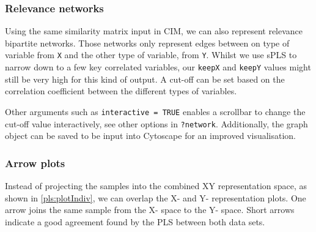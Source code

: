 \documentclass[]{book}
\newenvironment{Shaded}{\begin{snugshade}}{\end{snugshade}}
\newcommand{\KeywordTok}[1]{\textcolor[rgb]{0.13,0.29,0.53}{\textbf{#1}}}
\newcommand{\DataTypeTok}[1]{\textcolor[rgb]{0.13,0.29,0.53}{#1}}
\newcommand{\DecValTok}[1]{\textcolor[rgb]{0.00,0.00,0.81}{#1}}
\newcommand{\FloatTok}[1]{\textcolor[rgb]{0.00,0.00,0.81}{#1}}
\newcommand{\StringTok}[1]{\textcolor[rgb]{0.31,0.60,0.02}{#1}}
\newcommand{\CommentTok}[1]{\textcolor[rgb]{0.56,0.35,0.01}{\textit{#1}}}
\newcommand{\OtherTok}[1]{\textcolor[rgb]{0.56,0.35,0.01}{#1}}
\newcommand{\OperatorTok}[1]{\textcolor[rgb]{0.81,0.36,0.00}{\textbf{#1}}}
\newcommand{\NormalTok}[1]{#1}
\theoremstyle{definition}
\theoremstyle{definition}
\theoremstyle{definition}
\theoremstyle{remark}
\begin{document}
\subsubsection{Relevance networks}\label{pls:network}

Using the same similarity matrix input in CIM, we can also represent
relevance bipartite networks. Those networks only represent edges
between on type of variable from \texttt{X} and the other type of
variable, from \texttt{Y}. Whilst we use sPLS to narrow down to a few
key correlated variables, our \texttt{keepX} and \texttt{keepY} values
might still be very high for this kind of output. A cut-off can be set
based on the correlation coefficient between the different types of
variables.

Other arguments such as \texttt{interactive\ =\ TRUE} enables a
scrollbar to change the cut-off value interactively, see other options
in \texttt{?network}. Additionally, the graph object can be saved to be
input into Cytoscape for an improved visualisation.

\begin{Shaded}
\end{Shaded}

\subsubsection{Arrow plots}\label{arrow-plots}

Instead of projecting the samples into the combined XY representation
space, as shown in \ref{pls:plotIndiv}, we can overlap the X- and Y-
representation plots. One arrow joins the same sample from the X- space
to the Y- space. Short arrows indicate a good agreement found by the PLS
between both data sets.

\begin{Shaded}
\end{Shaded}
\end{document}
